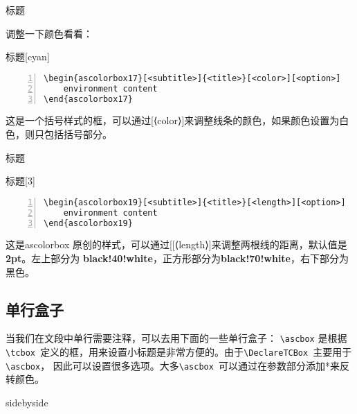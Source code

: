 \documentclass[a4]{ctexart}
\newcommand{\md}[1]{{\color{purple}#1}}
\begin{document}
\begin{ascolorbox17}[子标题]{标题}
    \zhlipsum[1]
\end{ascolorbox17}
调整一下颜色看看：
\begin{ascolorbox17}[子标题]{标题}[cyan]
    \zhlipsum[1]
\end{ascolorbox17}
\begin{lstlisting}[backgroundcolor=\color{gray!5},framerule=1pt,frame=tb,numbers=left,
    numberstyle=\tiny\color{black},]
\begin{ascolorbox17}[<subtitle>]{<title>}[<color>][<option>]
    environment content
\end{ascolorbox17}
\end{lstlisting}
这是一个括号样式的框，可以通过\md{[⟨color⟩]}来调整线条的颜色，如果颜色设置为白色，则只包括括号部分。

\begin{ascolorbox19}[子标题]{标题}
    \zhlipsum[1]
\end{ascolorbox19}

\begin{ascolorbox19}[子标题]{标题}[3]
    \zhlipsum[1]
\end{ascolorbox19}

\begin{lstlisting}[backgroundcolor=\color{gray!5},framerule=1pt,frame=tb,numbers=left,
    numberstyle=\tiny\color{black},]
\begin{ascolorbox19}[<subtitle>]{<title>}[<length>][<option>]
    environment content
\end{ascolorbox19}
\end{lstlisting}
这是ascolorbox 原创的样式，可以通过[\md{[⟨length⟩]}来调整两根线的距离，默认值是\textbf{2pt}。左上部分为
\textbf{black!40!white}，正方形部分为\textbf{black!70!white}，右下部分为黑色。


\subsection{单行盒子}
当我们在文段中单行需要注释，可以去用下面的一些单行盒子：
\verb|\ascbox| 是根据\verb|\tcbox |定义的框，用来设置小标题是非常方便的。由于\verb|\DeclareTCBox |主要用于\verb|\ascbox|，
因此可以设置很多选项。大多\verb|\ascbox |可以通过在参数部分添加*来反转颜色。

\begin{tcblisting}{sidebyside}
    
\end{tcblisting}
\end{document}
